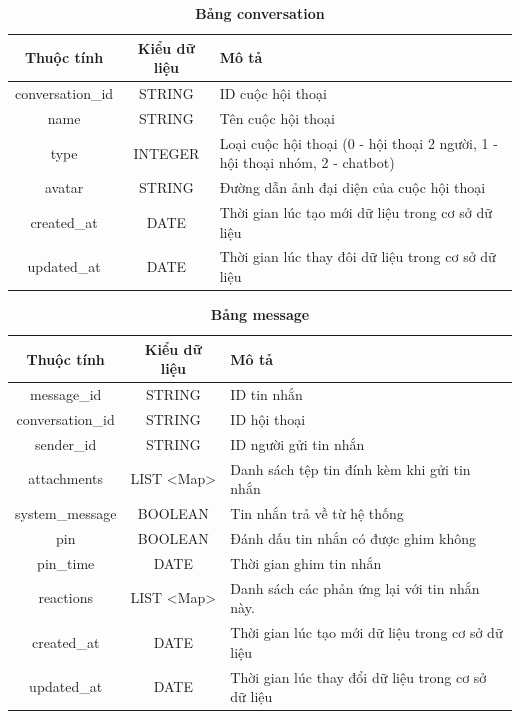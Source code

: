 \begin{table}[H]
  \caption{\bfseries \fontsize{12pt}{0pt}\selectfont Bảng conversation}
  \centering
  \begin{tabularx}{\textwidth}{|c|c|X|}
    \hline
    \textbf{Thuộc tính} & \textbf{Kiểu dữ liệu} & \textbf{Mô tả} \\
    \hline
    conversation\_id & STRING & ID cuộc hội thoại  \\
    \hline
    name & STRING & Tên cuộc hội thoại \\
    \hline
    type & INTEGER & Loại cuộc hội thoại (0 - hội thoại 2 người, 1 - hội thoại nhóm, 2 - chatbot) \\
    \hline
    avatar & STRING & Đường dẫn ảnh đại diện của cuộc hội thoại  \\
    \hline
    created\_at & DATE & Thời gian lúc tạo mới dữ liệu trong cơ sở dữ liệu \\
    \hline
    updated\_at & DATE & Thời gian lúc thay đôi dữ liệu trong cơ sở dữ liệu \\
    \hline
  \end{tabularx}
\end{table}

\begin{table}[H]
  \caption{\bfseries \fontsize{12pt}{0pt}\selectfont Bảng message}
  \centering
  \begin{tabularx}{\textwidth}{|c|c|X|}
    \hline
    \textbf{Thuộc tính} & \textbf{Kiểu dữ liệu} & \textbf{Mô tả} \\
    \hline
    message\_id & STRING & ID tin nhắn  \\
    \hline
    conversation\_id & STRING & ID hội thoại  \\
    \hline
    sender\_id & STRING & ID người gửi tin nhắn  \\
    \hline
    attachments & LIST <Map> & Danh sách tệp tin đính kèm khi gửi tin nhắn\\
    \hline
    system\_message & BOOLEAN & Tin nhắn trả về từ hệ thống\\
    \hline
    pin & BOOLEAN & Đánh dấu tin nhắn có được ghim không\\
    \hline
    pin\_time & DATE & Thời gian ghim tin nhắn\\
    \hline
    reactions & LIST <Map> & Danh sách các phản ứng lại với tin nhắn này.\\
    \hline
    created\_at & DATE & Thời gian lúc tạo mới dữ liệu trong cơ sở dữ liệu \\
    \hline
    updated\_at & DATE & Thời gian lúc thay đổi dữ liệu trong cơ sở dữ liệu \\
    \hline
  \end{tabularx}
\end{table}

